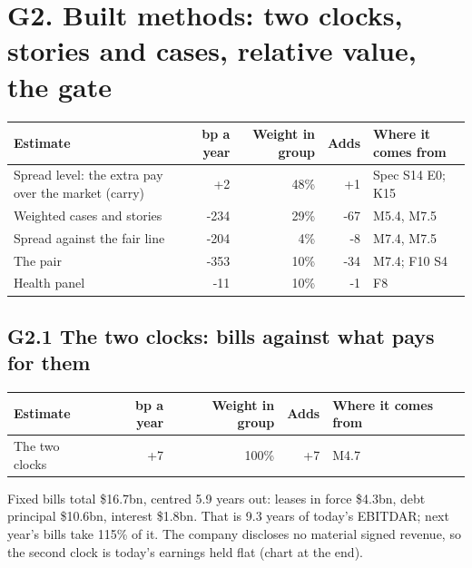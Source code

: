 \documentclass[11pt,a4paper]{article}
\begin{document}
\section*{G2. Built methods: two clocks, stories and cases, relative value, the gate}
\par\noindent{}
\begin{center}\footnotesize\setlength{\tabcolsep}{3.5pt}\begin{tabular}{@{}p{6.2cm}rrrp{4.2cm}@{}}\toprule
Estimate & bp a year & Weight in group & Adds & Where it comes from \\\midrule
Spread level: the extra pay over the market (carry) & +2 & 48\% & +1 & Spec S14 E0; K15 \\
Weighted cases and stories & -234 & 29\% & -67 & M5.4, M7.5 \\
Spread against the fair line & -204 & 4\% & -8 & M7.4, M7.5 \\
The pair & -353 & 10\% & -34 & M7.4; F10 S4 \\
Health panel & -11 & 10\% & -1 & F8 \\
\bottomrule\end{tabular}\end{center}
\subsection*{G2.1 The two clocks: bills against what pays for them}
\par\noindent{}
\begin{center}\footnotesize\setlength{\tabcolsep}{3.5pt}\begin{tabular}{@{}p{6.2cm}rrrp{4.2cm}@{}}\toprule
Estimate & bp a year & Weight in group & Adds & Where it comes from \\\midrule
The two clocks & +7 & 100\% & +7 & M4.7 \\
\bottomrule\end{tabular}\end{center}
Fixed bills total \$16.7bn, centred 5.9 years out: leases in force \$4.3bn, debt principal \$10.6bn, interest \$1.8bn. That is 9.3 years of today's EBITDAR; next year's bills take 115\% of it.
The company discloses no material signed revenue, so the second clock is today's earnings held flat (chart at the end).
\end{document}
